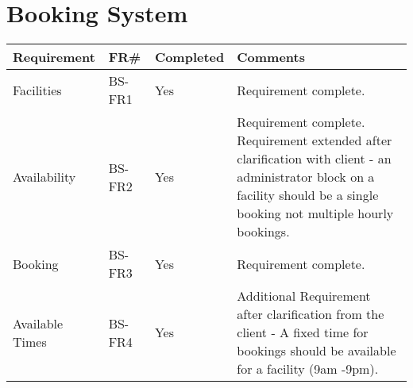 \section{Booking System}
\begin{tabular}{ |p{5cm}|l|l|p{8cm}|}
\hline
\textbf{Requirement}	&	\textbf{FR\#}	&	\textbf{Completed}	&	\textbf{Comments} \\
\hline
Facilities      									& BS-FR1	& Yes      		& Requirement complete. \\
\hline
Availability   										& BS-FR2	& Yes      		& Requirement complete. Requirement extended after clarification with client - an administrator block on a facility should be a single booking not multiple hourly bookings. 	\\
\hline
Booking         									& BS-FR3	& Yes      		& Requirement complete. \\
\hline
Available Times 									& BS-FR4	& Yes      		& Additional Requirement after clarification from the client - A fixed time for bookings should be available for a facility (9am -9pm). \\

\hline
\end{tabular}

